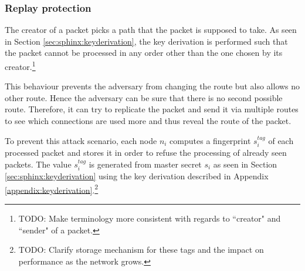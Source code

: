 \subsubsection{Replay protection}
\label{sec:sphinx:replayprotection}

The creator of a packet picks a path that the packet is supposed to take. As seen in Section \ref{sec:sphinx:keyderivation}, the key derivation is performed such that the packet cannot be processed in any order other than the one chosen by its creator.\footnote{TODO: Make terminology more consistent with regards to ``creator" and ``sender" of a packet.}

This behaviour prevents the adversary from changing the route but also allows no other route. Hence the adversary can be sure that there is no second possible route. Therefore, it can try to replicate the packet and send it via multiple routes to see which connections are used more and thus reveal the route of the packet.

To prevent this attack scenario, each node $n_i$ computes a fingerprint $s_i^{tag}$ of each processed packet and stores it in order to refuse the processing of already seen packets. The value $s_i^{tag}$ is generated from master secret $s_i$ as seen in Section \ref{sec:sphinx:keyderivation} using the key derivation described in Appendix \ref{appendix:keyderivation}.\footnote{TODO: Clarify storage mechanism for these tags and the impact on performance as the network grows.}
